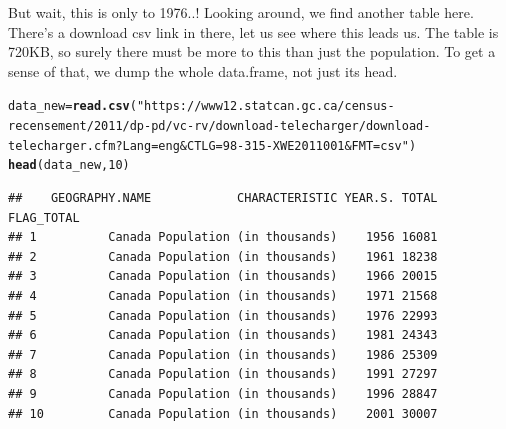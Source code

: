 \documentclass[aspectratio=169]{beamer}\usepackage[]{graphicx}\usepackage[]{xcolor}
\makeatletter
\newcommand{\hlnum}[1]{\textcolor[rgb]{0.686,0.059,0.569}{#1}}%
\newcommand{\hlsng}[1]{\textcolor[rgb]{0.192,0.494,0.8}{#1}}%
\newcommand{\hldef}[1]{\textcolor[rgb]{0.345,0.345,0.345}{#1}}%
\newcommand{\hlkwb}[1]{\textcolor[rgb]{0.69,0.353,0.396}{#1}}%
\newcommand{\hlkwd}[1]{\textcolor[rgb]{0.737,0.353,0.396}{\textbf{#1}}}%
\newenvironment{kframe}{%
 \def\at@end@of@kframe{}%
 \ifinner\ifhmode%
  \def\at@end@of@kframe{\end{minipage}}%
  \begin{minipage}{\columnwidth}%
 \fi\fi%
 \def\FrameCommand##1{\hskip\@totalleftmargin \hskip-\fboxsep
 \colorbox{shadecolor}{##1}\hskip-\fboxsep
     \hskip-\linewidth \hskip-\@totalleftmargin \hskip\columnwidth}%
 \MakeFramed {\advance\hsize-\width
   \@totalleftmargin\z@ \linewidth\hsize
   \@setminipage}}%
 {\par\unskip\endMakeFramed%
 \at@end@of@kframe}
\newenvironment{knitrout}{}{} %
\makeatother
\begin{document}
\begin{frame}[fragile]
But wait, this is only to 1976..! Looking around, we find another table here. There's a download csv link in there, let us see where this leads us. The table is 720KB, so surely there must be more to this than just the population. To get a sense of that, we dump the whole data.frame, not just its head.

\begin{knitrout}
\color{fgcolor}\begin{kframe}
\begin{alltt}
\hldef{data_new} \hlkwb{=} \hlkwd{read.csv}\hldef{(}\hlsng{"https://www12.statcan.gc.ca/census-recensement/2011/dp-pd/vc-rv/download-telecharger/download-telecharger.cfm?Lang=eng&CTLG=98-315-XWE2011001&FMT=csv"}\hldef{)}
\hlkwd{head}\hldef{(data_new,} \hlnum{10}\hldef{)}
\end{alltt}
\begin{verbatim}
##    GEOGRAPHY.NAME            CHARACTERISTIC YEAR.S. TOTAL FLAG_TOTAL
## 1          Canada Population (in thousands)    1956 16081           
## 2          Canada Population (in thousands)    1961 18238           
## 3          Canada Population (in thousands)    1966 20015           
## 4          Canada Population (in thousands)    1971 21568           
## 5          Canada Population (in thousands)    1976 22993           
## 6          Canada Population (in thousands)    1981 24343           
## 7          Canada Population (in thousands)    1986 25309           
## 8          Canada Population (in thousands)    1991 27297           
## 9          Canada Population (in thousands)    1996 28847           
## 10         Canada Population (in thousands)    2001 30007
\end{verbatim}
\end{kframe}
\end{knitrout}
\end{frame}
\end{document}
